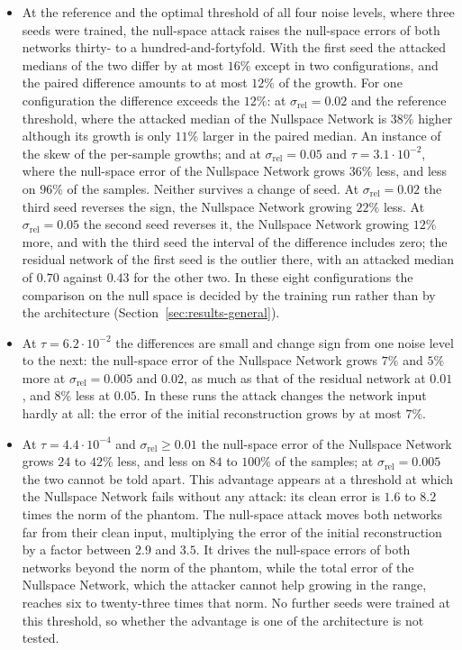 \documentclass{article}
\numberwithin{equation}{section}
\begin{document}
\begin{itemize}
\item At the reference and the optimal threshold of all four noise levels, where three seeds were
trained, the null-space attack raises the null-space errors of both networks thirty- to a
hundred-and-fortyfold. With the first seed the attacked medians of the two differ by at most $16\%$
except in two configurations, and the paired difference amounts to at most $12\%$ of the growth. For one configuration the difference exceeds the $12\%$: at $\sigma_\text{rel}=0.02$ and the reference threshold, where the attacked median of the Nullspace
Network is $38\%$ higher although its growth is only $11\%$ larger in the paired median. An instance of the
skew of the per-sample growths; and at $\sigma_\text{rel}=0.05$ and $\tau=3.1\cdot10^{-2}$, where the
null-space error of the Nullspace Network grows $36\%$ less, and less on $96\%$ of the samples. Neither
survives a change of seed. At $\sigma_\text{rel}=0.02$ the third seed reverses the sign, the
Nullspace Network growing $22\%$ less. At $\sigma_\text{rel}=0.05$ the second seed reverses it, the
Nullspace Network growing $12\%$ more, and with the third seed the interval of the difference includes zero; the residual network
of the first seed is the outlier there, with an attacked median of $0.70$ against $0.43$ for the other
two. In these eight configurations the comparison on the null space is decided by the training run rather
than by the architecture (Section~\ref{sec:results-general}).
\item At $\tau=6.2\cdot10^{-2}$ the differences are small and change sign from one noise level to the
next: the null-space error of the Nullspace Network grows $7\%$ and $5\%$ more at $\sigma_\text{rel}=0.005$
and $0.02$, as much as that of the residual network at $0.01$, and $8\%$ less at $0.05$. In these runs the
attack changes the network input hardly at all: the error of the initial reconstruction grows by at most
$7\%$.
\item At $\tau=4.4\cdot10^{-4}$ and $\sigma_\text{rel}\geq0.01$ the null-space error of the Nullspace
Network grows $24$ to $42\%$ less, and less on $84$ to $100\%$ of the samples; at $\sigma_\text{rel}=0.005$
the two cannot be told apart. This advantage appears at a threshold at which the Nullspace Network fails
without any attack: its clean error is $1.6$ to $8.2$ times the norm of the phantom. The null-space attack
moves both networks far from their clean input, multiplying the error of the initial reconstruction by a
factor between $2.9$ and $3.5$. It drives the null-space errors of both networks beyond the norm of the
phantom, while the total error of the Nullspace Network, which the attacker cannot help growing in the
range, reaches six to twenty-three times that norm. No further seeds were trained at this threshold, so
whether the advantage is one of the architecture is not tested.
\end{itemize}
\end{document}
